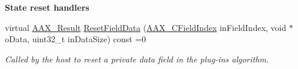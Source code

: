 \begin{Indent}{\bf State reset handlers}\par
\begin{DoxyCompactItemize}
\item 
virtual \hyperlink{a00149_a4d8f69a697df7f70c3a8e9b8ee130d2f}{A\+A\+X\+\_\+\+Result} \hyperlink{a00061_a6e87e40d42c7431e52ae5ebd4f631964}{Reset\+Field\+Data} (\hyperlink{a00149_ae807f8986143820cfb5d6da32165c9c7}{A\+A\+X\+\_\+\+C\+Field\+Index} in\+Field\+Index, void $\ast$o\+Data, uint32\+\_\+t in\+Data\+Size) const =0
\begin{DoxyCompactList}\small\item\em Called by the host to reset a private data field in the plug-\/in\textquotesingle{}s algorithm. \end{DoxyCompactList}\end{DoxyCompactItemize}
\end{Indent}
